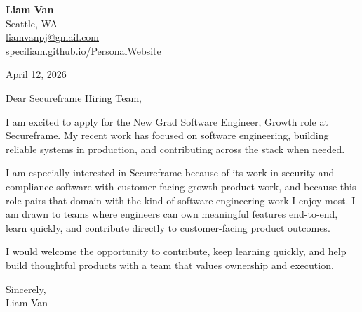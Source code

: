 \documentclass[letterpaper,11pt]{article}
\begin{document}
\begin{flushleft}
\textbf{\Large Liam Van} \\
Seattle, WA \\
\href{mailto:liamvanpj@gmail.com}{liamvanpj@gmail.com} \\
\href{https://speciliam.github.io/PersonalWebsite}{speciliam.github.io/PersonalWebsite}
\end{flushleft}

April 12, 2026

\noindent Dear Secureframe Hiring Team,

\noindent I am excited to apply for the New Grad Software Engineer, Growth role at Secureframe. My recent work has focused on software engineering, building reliable systems in production, and contributing across the stack when needed.

\noindent I am especially interested in Secureframe because of its work in security and compliance software with customer-facing growth product work, and because this role pairs that domain with the kind of software engineering work I enjoy most. I am drawn to teams where engineers can own meaningful features end-to-end, learn quickly, and contribute directly to customer-facing product outcomes.

\noindent I would welcome the opportunity to contribute, keep learning quickly, and help build thoughtful products with a team that values ownership and execution.

\noindent Sincerely, \\
Liam Van
\end{document}
